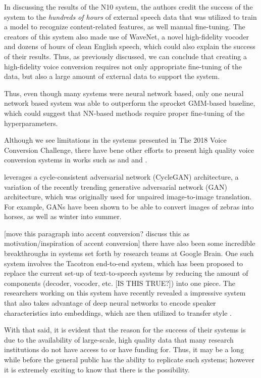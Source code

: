 \documentclass
[
    a4paper,
    twoside,
    12pt
]
{report}
\begin{document}
In discussing the results of the N10 system, the authors credit the
success of the system to the \emph{hundreds of hours} of external speech
data that was utilized to train a model to recognize content-related
features, as well manual fine-tuning. The creators of this system also
made use of WaveNet, a novel high-fidelity vocoder and dozens of hours
of clean English speech, which could also explain the success of their
results. Thus, as previously discussed, we can conclude that creating a
high-fidelity voice conversion requires not only appropriate fine-tuning
of the data, but also a large amount of external data to support the
system.

Thus, even though many systems were neural network based, only one
neural network based system was able to outperform the sprocket
GMM-based baseline, which could suggest that NN-based methods require
proper fine-tuning of the hyperparameters.

Although we see limitations in the systems presented in The 2018 Voice
Conversion Challenge, there have bene other efforts to present high
quality voice conversion systems in works such as and
\textcite{nguyen2016} and \textcite{fang2018}.

\textcite{fang2018} leverages a cycle-consistent adversarial network
(CycleGAN) architecture, a variation of the recently trending generative
adversarial network (GAN) architecture, which was originally used for
unpaired image-to-image translation. For example, GANs have been shown
to be able to convert images of zebras into horses, as well as winter
into summer.

{[}move this paragraph into accent conversion? discuss this as
motivation/inspiration of accent conversion{]} there have also been some
incredible breakthroughs in systems set forth by research teams at
Google Brain. One such system involves the Tacotron end-to-end system,
which has been proposed to replace the current set-up of text-to-speech
systems by reducing the amount of components (decoder, vocoder, etc.
{[}IS THIS TRUE?{]}) into one piece. The researchers working on this
system have recently revealed a impressive system that also takes
advantage of deep neural networks to encode speaker characteristics into
embeddings, which are then utilized to transfer style
\parencite{wang2018}.

With that said, it is evident that the reason for the success of their
systems is due to the availability of large-scale, high quality data
that many research institutions do not have access to or have funding
for. Thus, it may be a long while before the general public has the
ability to replicate such systems; however it is extremely exciting to
know that there is the possibility.
\end{document}
